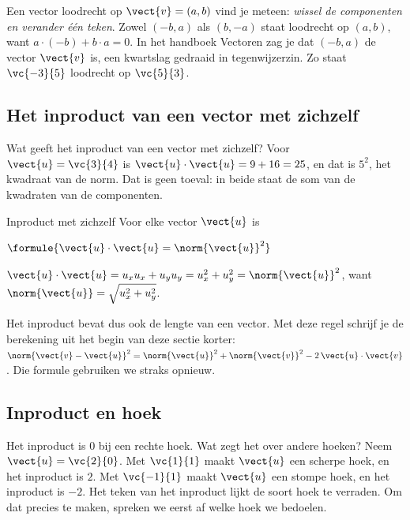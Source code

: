 Een vector loodrecht op $\vect{v} = (a, b)$ vind je meteen: \textit{wissel de componenten en verander één teken}. Zowel $(-b, a)$ als $(b, -a)$ staat loodrecht op $(a, b)$, want $a \cdot ({-b}) + b \cdot a = 0$. In het handboek Vectoren zag je dat $(-b, a)$ de vector $\vect{v}$ is, een kwartslag gedraaid in tegenwijzerzin. Zo staat $\vc{-3}{5}$ loodrecht op $\vc{5}{3}$.

\begin{oefeningen}

\end{oefeningen}

\subsection{Het inproduct van een vector met zichzelf}

Wat geeft het inproduct van een vector met zichzelf? Voor $\vect{u} = \vc{3}{4}$ is $\vect{u} \cdot \vect{u} = 9 + 16 = 25$, en dat is $5^2$, het kwadraat van de norm. Dat is geen toeval: in beide staat de som van de kwadraten van de componenten.

\begin{theorie}
\begin{stelling}{Inproduct met zichzelf}
Voor elke vector $\vect{u}$ is

\vspace{1mm}
\qquad $\formule{\vect{u} \cdot \vect{u} = \norm{\vect{u}}^2}$
\end{stelling}
\begin{bewijs}
$\vect{u} \cdot \vect{u} = u_x u_x + u_y u_y = u_x^2 + u_y^2 = \norm{\vect{u}}^2$, want $\norm{\vect{u}} = \sqrt{u_x^2 + u_y^2}$.
\end{bewijs}
\end{theorie}

Het inproduct bevat dus ook de lengte van een vector. Met deze regel schrijf je de berekening uit het begin van deze sectie korter: $\norm{\vect{v} - \vect{u}}^2 = \norm{\vect{u}}^2 + \norm{\vect{v}}^2 - 2\,\vect{u} \cdot \vect{v}$. Die formule gebruiken we straks opnieuw.

\subsection{Inproduct en hoek}

Het inproduct is $0$ bij een rechte hoek. Wat zegt het over andere hoeken? Neem $\vect{u} = \vc{2}{0}$. Met $\vc{1}{1}$ maakt $\vect{u}$ een scherpe hoek, en het inproduct is $2$. Met $\vc{-1}{1}$ maakt $\vect{u}$ een stompe hoek, en het inproduct is $-2$. Het teken van het inproduct lijkt de soort hoek te verraden. Om dat precies te maken, spreken we eerst af welke hoek we bedoelen.

